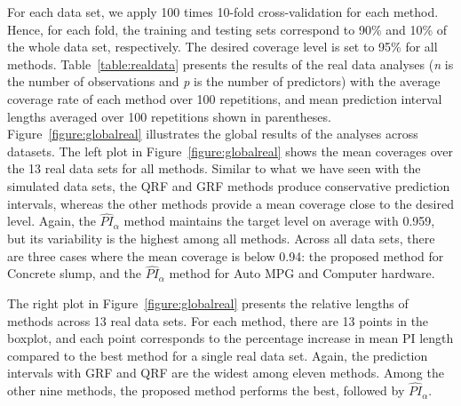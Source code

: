 For each data set, we apply 100 times 10-fold cross-validation for each method. Hence, for each fold, the training and testing sets correspond to 90\% and 10\% of the whole data set, respectively. The desired coverage level is set to 95\% for all methods. Table~\ref{table:realdata} presents the results of the real data analyses (\emph{n} is the number of observations and \emph{p} is the number of predictors) with the average coverage rate of each method over 100 repetitions, and mean prediction interval lengths averaged over 100 repetitions shown in parentheses. Figure~\ref{figure:globalreal} illustrates the global results of the analyses across datasets. The left plot in Figure~\ref{figure:globalreal} shows the mean coverages over the 13 real data sets for all methods. Similar to what we have seen with the simulated data sets, the QRF and GRF methods produce conservative prediction intervals, whereas the other methods provide a mean coverage close to the desired level. Again, the $\widehat{PI}_\alpha$ method maintains the target level on average with 0.959, but its variability is the highest among all methods. Across all data sets, there are three cases where the mean coverage is below 0.94: the proposed method for Concrete slump, and the $\widehat{PI}_\alpha$ method for Auto MPG and Computer hardware. 

The right plot in Figure~\ref{figure:globalreal} presents the relative lengths of methods across 13 real data sets. For each method, there are 13 points in the boxplot, and each point corresponds to the percentage increase in mean PI length compared to the best method for a single real data set. Again, the prediction intervals with GRF and QRF are the widest among eleven methods. Among the other nine methods, the proposed method performs the best, followed by $\widehat{PI}_\alpha$. 

